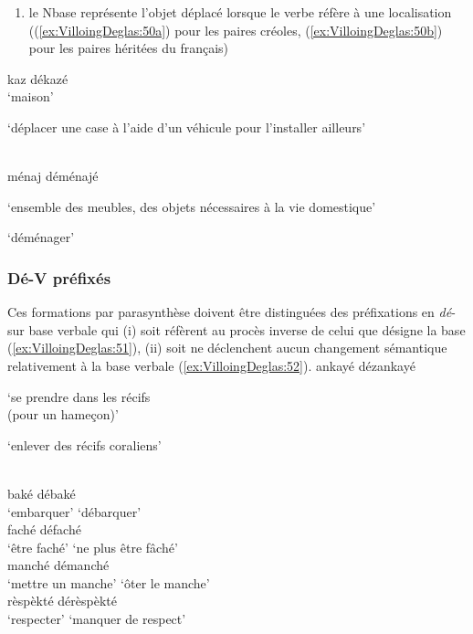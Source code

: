 \documentclass[output=paper]{langsci/langscibook}
\begin{document}
\begin{enumerate}[resume]\def\labelenumi{(\roman{enumi})}

\item
  le Nbase représente l'objet déplacé lorsque le verbe réfère à une
  localisation ((\ref{ex:VilloingDeglas:50a}) pour les paires créoles, (\ref{ex:VilloingDeglas:50b}) pour les paires
  héritées du français)
\end{enumerate}

\ea \label{ex:VilloingDeglas:50}
      \ea\label{ex:VilloingDeglas:50a} 
      \gll kaz \textrightarrow{} dékazé\\
      `maison' {} {\begin{minipage}[t]{.5\textwidth}\raggedright`déplacer une case à l'aide d'un véhicule
        pour l'installer ailleurs'\end{minipage}}\\
      \ex\label{ex:VilloingDeglas:50b} \gll  ménaj  \textrightarrow{} déménajé\\
      {\begin{minipage}[t]{.4\textwidth}\raggedright`ensemble des meubles, des objets nécessaires à la vie
        domestique'\end{minipage}} {} `déménager'\\
\z\z

\subsubsection{Dé-V préfixés}\label{subsubsection:VilloingDeglas:dé-v-préfixés}

Ces formations par parasynthèse doivent être distinguées des
préfixations en \emph{dé}- sur base verbale qui (i) soit réfèrent au
procès inverse de celui que désigne la base (\ref{ex:VilloingDeglas:51}), (ii) soit ne
déclenchent aucun changement sémantique relativement à la base verbale
(\ref{ex:VilloingDeglas:52}).
\ea \label{ex:VilloingDeglas:51}
      \ea \gll ankayé  \textrightarrow{} dézankayé\\
  {\begin{minipage}[t]{.4\textwidth}\raggedright`se prendre dans les récifs\\ (pour un hameçon)'\end{minipage}} {} {\begin{minipage}[t]{.3\textwidth}\raggedright`enlever des récifs coraliens'\end{minipage}}\\
      \ex \gll  baké \textrightarrow{} débaké\\
        {`embarquer'} {} {`débarquer'}\\
      \ex \gll  faché \textrightarrow{} défaché\\
        {`être faché'} {} {`ne plus être fâché'}\\
      \ex \gll  manché \textrightarrow{} démanché\\
        {`mettre un manche'} {} {`ôter le manche'}\\
      \ex \gll  rèspèkté \textrightarrow{} dérèspèkté\\
        {`respecter'} {} {`manquer de respect'}\\
      \z
\end{document}
